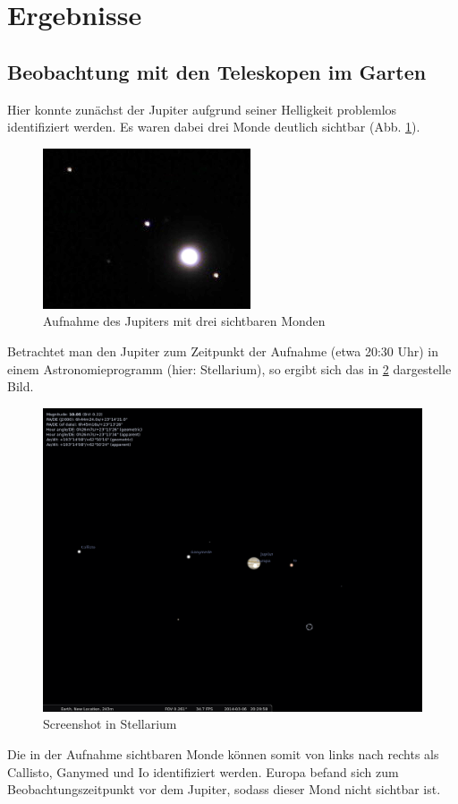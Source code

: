 \section{Ergebnisse}
\subsection{Beobachtung mit den Teleskopen im Garten}
Hier konnte zunächst der Jupiter aufgrund seiner Helligkeit problemlos identifiziert werden. Es waren dabei drei Monde deutlich sichtbar (Abb. \ref{fig:jup}). 


\begin{figure}[h!]
\centering
        \includegraphics[width=.4\textwidth]{img_jup.png}
\caption{Aufnahme des Jupiters mit drei sichtbaren Monden }
\label{fig:jup}
\end{figure}

Betrachtet man den Jupiter zum Zeitpunkt der Aufnahme (etwa 20:30 Uhr) in einem Astronomieprogramm (hier: Stellarium), so ergibt sich das in \ref{fig:scr} dargestelle Bild. 

\begin{figure}[h!]
\centering
        \includegraphics[width=.8\textwidth]{screenshot_jupiter2.png}
\caption{ Screenshot in Stellarium }
\label{fig:scr}
\end{figure}
Die in der Aufnahme sichtbaren Monde können somit von links nach rechts als Callisto, Ganymed und Io identifiziert werden. Europa befand sich zum Beobachtungszeitpunkt vor dem Jupiter, sodass dieser Mond nicht sichtbar ist. \\

